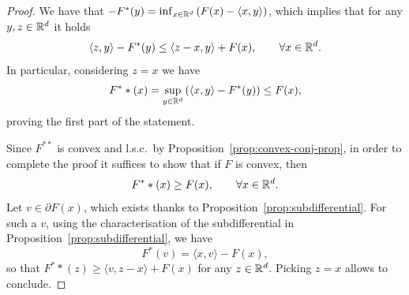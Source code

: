 \documentclass{report}
\begin{document}
\begin{proof}
	We have that $-F^*(y)=\inf_{x\in\mathbb{R}^d} \left(F(x)-\langle x,y\rangle\right)$, which implies that for any $y,z\in\mathbb{R}^d$ it holds 
	\begin{equation}
		\langle z,y\rangle - F^*(y) \le \langle z-x,y\rangle +F(x), \qquad \forall x\in\mathbb{R}^d.
	\end{equation}
	In particular, considering $z=x$ we have 
	\begin{equation}
		F^**(x) = \sup_{y\in\mathbb{R}^d} \left(\langle x,y\rangle - F^*(y)\right) \le F(x),
	\end{equation}
	proving the first part of the statement.
	
	Since $F^{**}$ is convex and l.s.c.~by Proposition~\ref{prop:convex-conj-prop}, in order to complete the proof it suffices to show that if $F$ is convex, then 
	\begin{equation}
		F^**(x)\ge F(x),\qquad \forall x\in\mathbb{R}^d.
	\end{equation}
	Let $v\in \partial F(x)$, which exists thanks to Proposition~\ref{prop:subdifferential}. For such a $v$, using the characterisation of the subdifferential in Proposition~\ref{prop:subdifferential}, we have 
	\begin{equation}
		F^*(v)=\langle x,v\rangle - F(x), 
	\end{equation}
	so that $F^**(z)\ge \langle v,z-x\rangle+F(x)$ for any $z\in \mathbb{R}^d$. Picking $z=x$ allows to conclude.
\end{proof}



\end{document}
